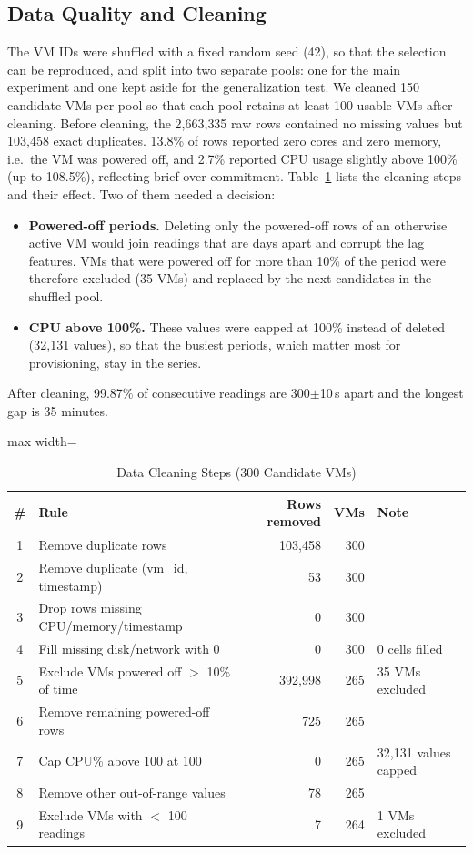 \documentclass[conference,letterpaper,10pt]{IEEEtran}
\begin{document}
\subsection{Data Quality and Cleaning}
The VM IDs were shuffled with a fixed random seed (42), so that the selection can be reproduced, and split into two separate pools: one for the main experiment and one kept aside for the generalization test. We cleaned 150 candidate VMs per pool so that each pool retains at least 100 usable VMs after cleaning. Before cleaning, the 2{,}663{,}335 raw rows contained no missing values but 103{,}458 exact duplicates. 13.8\% of rows reported zero cores and zero memory, i.e.\ the VM was powered off, and 2.7\% reported CPU usage slightly above 100\% (up to 108.5\%), reflecting brief over-commitment. Table~\ref{tab:cleaning} lists the cleaning steps and their effect. Two of them needed a decision:
\begin{itemize}
  \item \textbf{Powered-off periods.} Deleting only the powered-off rows of an otherwise active VM would join readings that are days apart and corrupt the lag features. VMs that were powered off for more than 10\% of the period were therefore excluded (35 VMs) and replaced by the next candidates in the shuffled pool.
  \item \textbf{CPU above 100\%.} These values were capped at 100\% instead of deleted (32{,}131 values), so that the busiest periods, which matter most for provisioning, stay in the series.
\end{itemize}
After cleaning, 99.87\% of consecutive readings are 300$\pm$10\,s apart and the longest gap is 35 minutes.

\begin{table}[!htb]
\centering
\caption{Data Cleaning Steps (300 Candidate VMs)}
\label{tab:cleaning}
\footnotesize
\setlength{\tabcolsep}{4pt}
\begin{adjustbox}{max width=\columnwidth}
\begin{tabular}{cp{3.0cm}rrp{1.55cm}}
\toprule
\# & Rule & Rows removed & VMs & Note \\
\midrule
1 & Remove duplicate rows & 103,458 & 300 &  \\
2 & Remove duplicate (vm\_id, timestamp) & 53 & 300 &  \\
3 & Drop rows missing CPU/memory/timestamp & 0 & 300 &  \\
4 & Fill missing disk/network with 0 & 0 & 300 & 0 cells filled \\
5 & Exclude VMs powered off $>$ 10\% of time & 392,998 & 265 & 35 VMs excluded \\
6 & Remove remaining powered-off rows & 725 & 265 &  \\
7 & Cap CPU\% above 100 at 100 & 0 & 265 & 32,131 values capped \\
8 & Remove other out-of-range values & 78 & 265 &  \\
9 & Exclude VMs with $<$ 100 readings & 7 & 264 & 1 VMs excluded \\
\bottomrule
\end{tabular}
\end{adjustbox}
\end{table}
\end{document}
